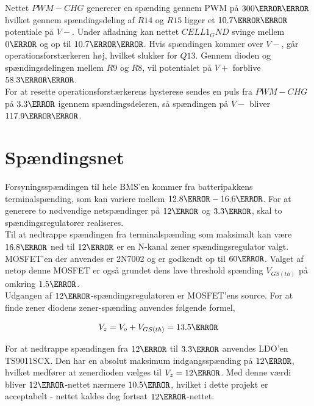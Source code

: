 Nettet $PWM-CHG$ genererer en spænding gennem PWM på $300\milli\volt$ hvilket gennem spændingsdeling af $R14$ og $R15$ ligger et $10.7\milli\volt$ potentiale på $V-$. Under afladning kan nettet $CELL1_GND$ svinge mellem $0\volt$ og op til $10.7\milli\volt$. Hvis spændingen kommer over $V-$, går operationsforstærkeren høj, hvilket slukker for $Q13$. Gennem dioden og spændingsdelingen mellem $R9$ og $R8$, vil potentialet på $V+$ forblive $58.3\milli\volt$.
\\

For at resette operationsforstærkerens hysterese sendes en puls fra $PWM-CHG$ på $3.3\volt$ igennem spændingsdeleren, så spændingen på $V-$ bliver $117.9\milli\volt$.


\section{Spændingsnet}\label{afs:voltagenet}
Forsyningsspændingen til hele BMS'en kommer fra batteripakkens terminalspænding, som kan variere mellem $12.8\volt - 16.6\volt$. For at generere to nødvendige netspændinger på $12\volt$ og $3.3\volt$, skal to spændingsregulatorer realiseres.
\\

Til at nedtrappe spændingen fra terminalspænding som maksimalt kan være $16.8\volt$ ned til $12\volt$ er en N-kanal zener spændingsregulator valgt. MOSFET'en der anvendes er 2N7002 og er godkendt op til $60\volt$. Valget af netop denne MOSFET er også grundet dens lave threshold spænding $V_{GS(th)}$ på omkring  $1.5\volt$.
\\


Udgangen af $12\volt$-spændingsregulatoren er MOSFET'ens source. For at finde zener diodens zener-spænding anvendes følgende formel,

\begin {equation} 
V_{z} = V_{o} + V_{GS(th)} = 13.5\volt
\end {equation}

For at nedtrappe spændingen fra $12\volt$ til $3.3\volt$ anvendes LDO'en TS9011SCX. Den har en absolut maksimum indgangsspænding på $12\volt$, hvilket medfører at zenerdioden vælges til $V_{z}=12\volt$. Med denne værdi bliver $12\volt$-nettet nærmere $10.5\volt$, hvilket i dette projekt er acceptabelt - nettet kaldes dog fortsat $12\volt$-nettet.

